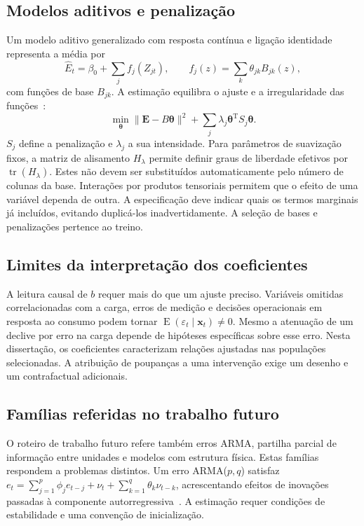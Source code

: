 \subsection{Modelos aditivos e penalização}
\label{sec:mat-gam}
Um modelo aditivo generalizado com resposta contínua e ligação identidade representa a média por
\begin{equation}
\widehat E_t=\beta_0+\sum_j f_j(Z_{jt}),
\qquad f_j(z)=\sum_k\theta_{jk}B_{jk}(z),
\label{eq:mat-gam}
\end{equation}
com funções de base $B_{jk}$. A estimação equilibra o ajuste e a irregularidade das funções~\parencite{HastieTibshirani1986,Wood2017}:
\begin{equation}
\min_{\boldsymbol\theta}\|\boldsymbol E-B\boldsymbol\theta\|^2
+\sum_j\lambda_j\boldsymbol\theta^{\mathrm T}S_j\boldsymbol\theta.
\label{eq:mat-penalizacao}
\end{equation}
$S_j$ define a penalização e $\lambda_j$ a sua intensidade. Para parâmetros de suavização fixos, a matriz de alisamento $H_\lambda$ permite definir graus de liberdade efetivos por $\operatorname{tr}(H_\lambda)$. Estes não devem ser substituídos automaticamente pelo número de colunas da base. Interações por produtos tensoriais permitem que o efeito de uma variável dependa de outra. A especificação deve indicar quais os termos marginais já incluídos, evitando duplicá-los inadvertidamente. A seleção de bases e penalizações pertence ao treino.

\subsection{Limites da interpretação dos coeficientes}
\label{sec:mat-causalidade}
A leitura causal de $b$ requer mais do que um ajuste preciso. Variáveis omitidas correlacionadas com a carga, erros de medição e decisões operacionais em resposta ao consumo podem tornar $\operatorname{E}(\varepsilon_t\mid\boldsymbol x_t)\neq0$. Mesmo a atenuação de um declive por erro na carga depende de hipóteses específicas sobre esse erro. Nesta dissertação, os coeficientes caracterizam relações ajustadas nas populações selecionadas. A atribuição de poupanças a uma intervenção exige um desenho e um contrafactual adicionais.

\subsection{Famílias referidas no trabalho futuro}
\label{sec:mat-modelos-futuros}
O roteiro de trabalho futuro refere também erros ARMA, partilha parcial de informação entre unidades e modelos com estrutura física. Estas famílias respondem a problemas distintos. Um erro ARMA($p,q$) satisfaz $e_t=\sum_{j=1}^p\phi_je_{t-j}+\nu_t+\sum_{k=1}^q\theta_k\nu_{t-k}$, acrescentando efeitos de inovações passadas à componente autorregressiva~\parencite{BoxJenkins2015}. A estimação requer condições de estabilidade e uma convenção de inicialização.

